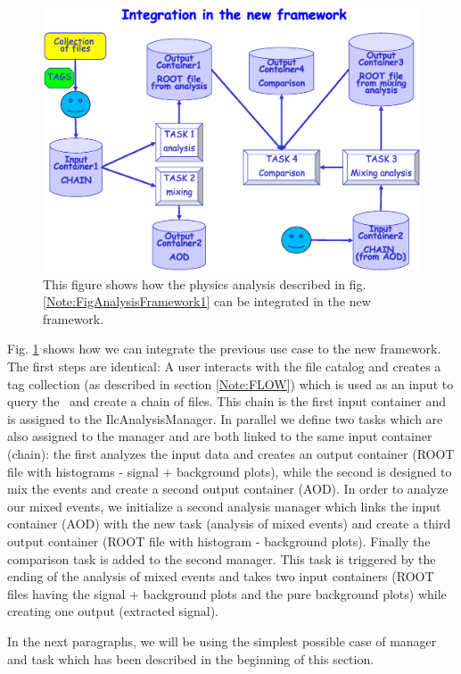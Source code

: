 \begin{figure}[ht!]
\begin{center}
\includegraphics[width=15cm]{figures/AnalysisFramework-2.eps}
\end{center}
\caption{This figure shows how the physics analysis described in fig. \ref{Note:FigAnalysisFramework1} can be integrated in the new framework.}
\label{Note:FigAnalysisFramework2}
\end{figure}

Fig. \ref{Note:FigAnalysisFramework2} shows how we can integrate the previous use case to the new framework. The first steps are identical: A user interacts with the file catalog and creates a tag collection (as described in section \ref{Note:FLOW}) which is used as an input to query the \tag ~and create a chain of files. This chain is the first input container and is assigned to the {\ttfamily IlcAnalysisManager}. In parallel we define two tasks which are also assigned to the manager and are both linked to the same input container (chain): the first analyzes the input data and creates an output container (ROOT file with histograms - signal + background plots), while the second is designed to mix the events and create a second output container (AOD). In order to analyze our mixed events, we initialize a second analysis manager which links the input container (AOD) with the new task (analysis of mixed events) and create a third output container (ROOT file with histogram - background plots). Finally the comparison task is added to the second manager. This task is triggered by the ending of the analysis of mixed events and takes two input containers (ROOT files having the signal + background plots and the pure background plots) while creating one output (extracted signal).

In the next paragraphs, we will be using the simplest possible case of manager and task which has been described in the beginning of this section.




